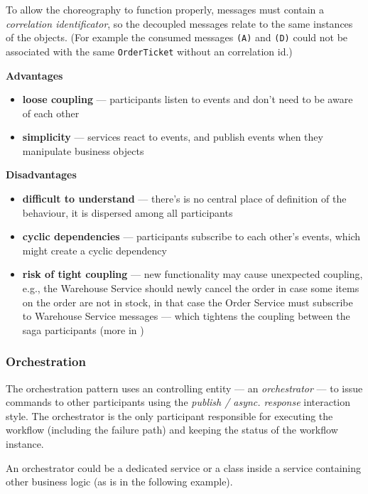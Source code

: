 \documentclass[thesis=M,english,hidelinks]{FITthesis}[2012/10/20]
\begin{document}
To allow the choreography to function properly, messages must contain a \textit{correlation identificator}, so the decoupled messages relate to the same instances of the objects. (For example the consumed messages \texttt{(A)} and \texttt{(D)} could not be associated with the same \texttt{OrderTicket} without an correlation id.)

\vspace{1em}
\noindent
\textbf{Advantages}
\begin{itemize}
    \item \textbf{loose coupling} --- participants listen to events and don't need to be aware of each other
    \item \textbf{simplicity} --- services react to events, and publish events when they manipulate business objects
\end{itemize}

\noindent
\textbf{Disadvantages}
\begin{itemize}
    \item \textbf{difficult to understand} --- there's is no central place of definition of the behaviour, it is dispersed among all participants
    \item \textbf{cyclic dependencies} --- participants subscribe to each other’s events, which might create a cyclic dependency
    \item \textbf{risk of tight coupling} --- new functionality may cause unexpected coupling, e.g., the Warehouse Service should newly cancel the order in case some items on the order are not in stock, in that case the Order Service must subscribe to Warehouse Service messages --- which tightens the coupling between the saga participants (more in \cite{ms-com-event-chor-coupling})
\end{itemize}

\subsubsection{Orchestration}
The orchestration pattern uses an controlling entity --- an \textit{orchestrator} --- to issue commands to other participants using the \textit{publish / async. response} interaction style. The orchestrator is the only participant responsible for executing the workflow (including the failure path) and keeping the status of the workflow instance.

An orchestrator could be a dedicated service or a class inside a service containing other business logic (as is in the following example).
\end{document}

